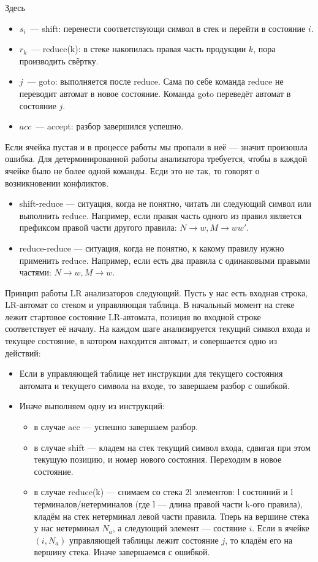 Здесь
\begin{itemize}
  \item $s_i$~--- shift: перенести соответствующи символ в стек и перейти в состояние $i$.
  \item $r_k$~--- reduce(k): в стеке накопилась правая часть продукции $k$, пора производить свёртку.
  \item $j$~--- goto: выполняется после reduce. Сама по себе команда reduce не переводит автомат в новое состояние. Команда goto переведёт автомат в состояние $j$.
  \item $acc$~--- accept: разбор завершился успешно.
\end{itemize}

Если ячейка пустая и в процессе работы мы пропали в неё --- значит произошла ошибка. Для детерминированной работы анализатора требуется, чтобы в каждой ячейке было не более одной команды. Есди это не так, то говорят о возникновении конфликтов.

\begin{itemize}
\item shift-reduce --- ситуация, когда не понятно, читать ли следующий символ или выполнить reduce. Например, если правая часть одного из правил является префиксом правой части другого правила: $N \rightarrow w, M \rightarrow ww'$.
\item reduce-reduce --- ситуация, когда не понятно, к какому правилу нужно применить reduce. Например, если есть два правила с одинаковыми правыми частями: $N \rightarrow w, M \rightarrow w$.
\end{itemize}

Принцип работы LR анализаторов следующий. Пусть у нас есть входная строка, LR-автомат со стеком и управляющая таблица.
В начальный момент на стеке лежит стартовое состояние LR-автомата, позиция во входной строке соответствует её началу.
На каждом шаге анализируется текущий символ входа и текущее состояние, в котором находится автомат, и совершается одно из действий:
\begin{itemize}
\item Если в управляющей таблице нет инструкции для текущего состояния автомата и текущего символа на входе, то завершаем разбор с ошибкой.
\item Иначе выполняем одну из инструкций:
\begin{itemize}
\item в случае acc --- успешно завершаем разбор.
\item в случае shift --- кладем на стек текущий символ входа, сдвигая при этом текущую позицию, и номер нового состояния. Переходим в новое состояние.
\item в случае reduce(k) --- снимаем со стека 2l элементов: l состояний и l терминалов/нетерминалов (где l --- длина правой части k-ого правила), кладём на стек нетерминал левой части правила. Тперь на вершине стека у нас нетерминал $N_a$, а следующий элемент --- состяние $i$. Если в ячейке $(i,N_a)$ управляющей таблицы лежит состояние $j$, то кладём его на вершину стека. Иначе завершаемся с ошибкой.
\end{itemize}
\end{itemize}


